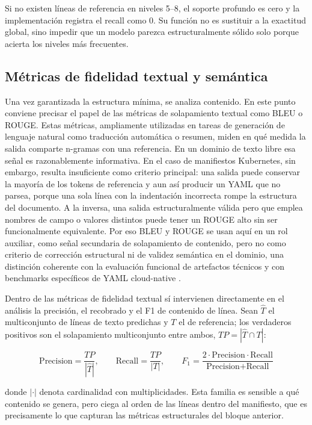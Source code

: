 Si no existen líneas de referencia en niveles 5--8, el soporte profundo es cero y la implementación registra el recall como \(0\). Su función no es sustituir a la exactitud
global, sino impedir que un modelo parezca estructuralmente sólido solo porque acierta los niveles más frecuentes.

\subsection{Métricas de fidelidad textual y semántica}
\label{sec:ch4_metrics_semantic}

Una vez garantizada la estructura mínima, se analiza contenido. En este punto conviene precisar el papel de las métricas de solapamiento textual como
BLEU o ROUGE. Estas métricas, ampliamente utilizadas en tareas de generación de lenguaje natural como traducción automática o resumen, miden en qué
medida la salida comparte n-gramas con una referencia. En un dominio de texto libre esa señal es razonablemente informativa. En el caso de manifiestos
Kubernetes, sin embargo, resulta insuficiente como criterio principal: una salida puede conservar la mayoría de los tokens de referencia y aun así
producir un YAML que no parsea, porque una sola línea con la indentación incorrecta rompe la estructura del documento. A la inversa, una salida
estructuralmente válida pero que emplea nombres de campo o valores distintos puede tener un ROUGE alto sin ser funcionalmente equivalente. Por eso
BLEU y ROUGE se usan aquí en un rol auxiliar, como señal secundaria de solapamiento de contenido, pero no como criterio de corrección estructural
ni de validez semántica en el dominio, una distinción coherente con la evaluación funcional de artefactos técnicos y con benchmarks específicos de
YAML cloud-native \citep{chen2021evaluating, xu2024cloudevalyaml}.

Dentro de las métricas de fidelidad textual sí intervienen directamente en el análisis la precisión, el recobrado y el F1 de contenido de línea.
Sean $\hat{T}$ el multiconjunto de líneas de texto predichas y $T$ el de referencia; los verdaderos positivos son el solapamiento multiconjunto
entre ambos, $TP = |\hat{T} \cap T|$:

$$\text{Precision} = \frac{TP}{|\hat{T}|}, \qquad \text{Recall} = \frac{TP}{|T|}, \qquad F_1 = \frac{2 \cdot \text{Precision} \cdot \text{Recall}}{\text{Precision} + \text{Recall}}$$

donde $|\cdot|$ denota cardinalidad con multiplicidades. Esta familia es sensible a qué contenido se genera, pero ciega al orden de las líneas
dentro del manifiesto, que es precisamente lo que capturan las métricas estructurales del bloque anterior.

